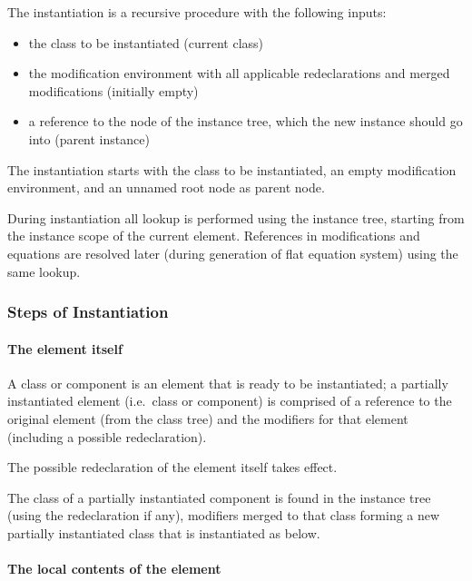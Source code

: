 The instantiation is a recursive procedure with the following inputs:
\begin{itemize}
\item
  the class to be instantiated (current class)
\item
  the modification environment with all applicable redeclarations and merged modifications (initially empty)
\item
  a reference to the node of the instance tree, which the new instance should go into (parent instance)
\end{itemize}

The instantiation starts with the class to be instantiated, an empty modification environment, and an unnamed root node as parent node.

During instantiation all lookup is performed using the instance tree, starting from the instance scope of the current element.
References in modifications and equations are resolved later (during generation of flat equation system) using the same lookup.


\subsubsection{Steps of Instantiation}\label{steps-of-instantiation}

\paragraph*{The element itself}\label{the-element-itself}

A  class or component is an element that is ready to be instantiated; a partially instantiated element (i.e.\ class or component) is comprised of a reference to the original element (from the class tree) and the modifiers for that element (including a possible redeclaration).

The possible redeclaration of the element itself takes effect.

The class of a partially instantiated component is found in the instance tree (using the redeclaration if any), modifiers merged to that class forming a new partially instantiated class that is instantiated as below.

\paragraph*{The local contents of the element}\label{the-local-contents-of-the-element}

